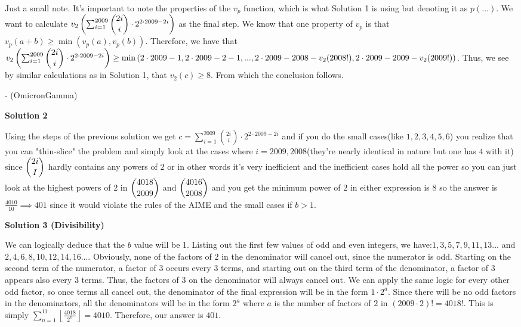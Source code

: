 \begin{enumerate}
 Just a small note. It's important to note the properties of the $v_p$ function, which is what Solution 1 is using but denoting it as $p (...)$. We want to calculate $v_2 \left( \sum ^{2009} _{i=1} \dbinom{2i}{i} \cdot 2^{2 \cdot 2009 - 2i} \right)$ as the final step. We know that one property of $v_p$ is that $v_p (a + b) \geq \min \left( v_p(a), v_p (b) \right)$. Therefore, we have that $v_2 \left( \sum ^{2009} _{i=1} \dbinom{2i}{i} \cdot 2^{2 \cdot 2009 - 2i} \right) \geq \min \left( 2 \cdot 2009 -1, 2 \cdot 2009 -2 - 1, ... , 2 \cdot 2009 - 2008 - v_2 (2008!), 2 \cdot 2009 - 2009 - v_2 (2009!) \right)$. Thus, we see by similar calculations as in Solution 1, that $v_2 (c) \geq 8$. From which the conclusion follows. 

 - (OmicronGamma)

 



\textbf{Solution 2}

Using the steps of the previous solution we get $c = \sum_{i=1}^{2009} {2i\choose i} \cdot 2^{2\cdot 2009 - 2i}$ and if you do the small cases(like $1, 2, 3, 4, 5, 6$) you realize that you can "thin-slice" the problem and simply look at the cases where $i=2009, 2008$(they're nearly identical in nature but one has $4$ with it) since $\dbinom{2i}{I}$ hardly contains any powers of $2$ or in other words it's very inefficient and the inefficient cases hold all the power so you can just look at the highest powers of $2$ in $\dbinom{4018}{2009}$ and $\dbinom{4016}{2008}$ and you get the minimum power of $2$ in either expression is $8$ so the answer is $\frac{4010}{10} \implies \boxed{401}$ since it would violate the rules of the AIME and the small cases if $b>1$.

 



\textbf{Solution 3 (Divisibility)}

We can logically deduce that the $b$ value will be 1. Listing out the first few values of odd and even integers, we have:$1, 3, 5, 7, 9, 11, 13...$ and $2, 4, 6, 8, 10, 12, 14, 16...$. Obviously, none of the factors of $2$ in the denominator will cancel out, since the numerator is odd. Starting on the second term of the numerator, a factor of $3$ occurs every $3$ terms, and starting out on the third term of the denominator, a factor of $3$ appears also every $3$ terms. Thus, the factors of $3$ on the denominator will always cancel out. We can apply the same logic for every other odd factor, so once terms all cancel out, the denominator of the final expression will be in the form $1 \cdot 2^a$. Since there will be no odd factors in the denominators, all the denominators will be in the form $2^a$ where $a$ is the number of factors of $2$ in $(2009 \cdot 2)! = 4018!$. This is simply $\sum_{n=1}^{11} \left \lfloor{\frac{4018}{2^n}}\right \rfloor = 4010$. Therefore, our answer is $\boxed{401}$.


\end{enumerate}
